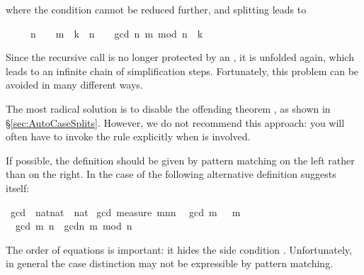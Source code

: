 \begin{isabellebody}
\begin{isamarkuptext}
\begin{isabelle}
\end{isabelle}
where the condition cannot be reduced further, and splitting leads to
\begin{isabelle}%
\ \ \ \ \ {\isacharparenleft}n\ {\isacharequal}\ {}\ {\isasymlongrightarrow}\ m\ {\isacharequal}\ k{\isacharparenright}\ {\isasymand}\ {\isacharparenleft}n\ {\isasymnoteq}\ {}\ {\isasymlongrightarrow}\ gcd\ {\isacharparenleft}n{\isacharcomma}\ m\ mod\ n{\isacharparenright}\ {\isacharequal}\ k{\isacharparenright}%
\end{isabelle}
Since the recursive call  is no longer protected by
an , it is unfolded again, which leads to an infinite chain of
simplification steps. Fortunately, this problem can be avoided in many
different ways.

The most radical solution is to disable the offending theorem
,
as shown in \S\ref{sec:AutoCaseSplits}.  However, we do not recommend this
approach: you will often have to invoke the rule explicitly when
 is involved.

If possible, the definition should be given by pattern matching on the left
rather than  on the right. In the case of  the
following alternative definition suggests itself:%
\end{isamarkuptext}%
\isamarkuptrue%
\ gcd{}\ {\isacharcolon}{\isacharcolon}\ {\isachardoublequote}nat{\isasymtimes}nat\ {\isasymRightarrow}\ nat{\isachardoublequote}\isanewline
\isamarkupfalse%
\ gcd{}\ {\isachardoublequote}measure\ {\isacharparenleft}{\isasymlambda}{\isacharparenleft}m{\isacharcomma}n{\isacharparenright}{\isachardot}n{\isacharparenright}{\isachardoublequote}\isanewline
\ \ {\isachardoublequote}gcd{}\ {\isacharparenleft}m{\isacharcomma}\ {}{\isacharparenright}\ {\isacharequal}\ m{\isachardoublequote}\isanewline
\ \ {\isachardoublequote}gcd{}\ {\isacharparenleft}m{\isacharcomma}\ n{\isacharparenright}\ {\isacharequal}\ gcd{}{\isacharparenleft}n{\isacharcomma}\ m\ mod\ n{\isacharparenright}{\isachardoublequote}\isamarkupfalse%
%
\begin{isamarkuptext}%
\noindent
The order of equations is important: it hides the side condition
.  Unfortunately, in general the case distinction
may not be expressible by pattern matching.


\end{isamarkuptext}
\end{isabellebody}
